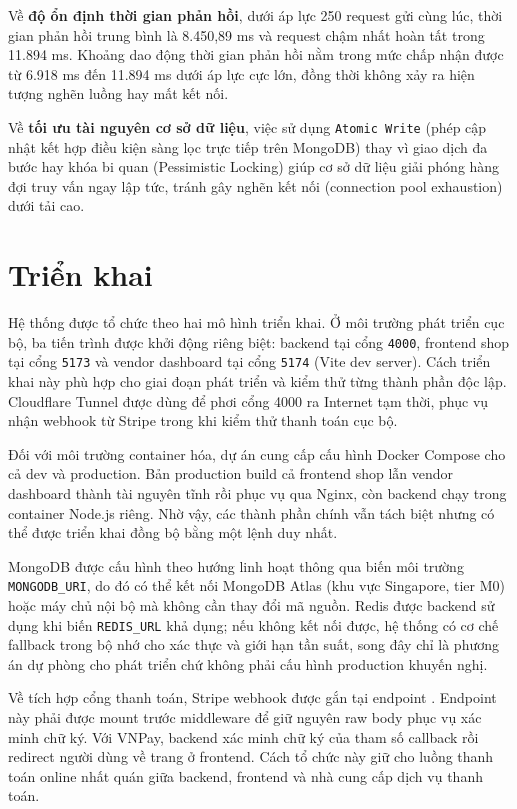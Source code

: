 \documentclass[../DoAn.tex]{subfiles}
\begin{document}
Về \textbf{độ ổn định thời gian phản hồi}, dưới áp lực 250 request gửi cùng lúc, thời gian phản hồi trung bình là 8.450,89 ms và request chậm nhất hoàn tất trong 11.894 ms. Khoảng dao động thời gian phản hồi nằm trong mức chấp nhận được từ 6.918 ms đến 11.894 ms dưới áp lực cực lớn, đồng thời không xảy ra hiện tượng nghẽn luồng hay mất kết nối.

Về \textbf{tối ưu tài nguyên cơ sở dữ liệu}, việc sử dụng \texttt{Atomic Write} (phép cập nhật kết hợp điều kiện sàng lọc trực tiếp trên MongoDB) thay vì giao dịch đa bước hay khóa bi quan (Pessimistic Locking) giúp cơ sở dữ liệu giải phóng hàng đợi truy vấn ngay lập tức, tránh gây nghẽn kết nối (connection pool exhaustion) dưới tải cao.
\section{Triển khai}
\label{section:4.5}

Hệ thống được tổ chức theo hai mô hình triển khai. Ở môi trường phát triển cục bộ, ba tiến trình được khởi động riêng biệt: backend tại cổng \texttt{4000}, frontend shop tại cổng \texttt{5173} và vendor dashboard tại cổng \texttt{5174} (Vite dev server). Cách triển khai này phù hợp cho giai đoạn phát triển và kiểm thử từng thành phần độc lập. Cloudflare Tunnel được dùng để phơi cổng 4000 ra Internet tạm thời, phục vụ nhận webhook từ Stripe trong khi kiểm thử thanh toán cục bộ.

Đối với môi trường container hóa, dự án cung cấp cấu hình Docker Compose cho cả dev và production. Bản production build cả frontend shop lẫn vendor dashboard thành tài nguyên tĩnh rồi phục vụ qua Nginx, còn backend chạy trong container Node.js riêng. Nhờ vậy, các thành phần chính vẫn tách biệt nhưng có thể được triển khai đồng bộ bằng một lệnh duy nhất.

MongoDB được cấu hình theo hướng linh hoạt thông qua biến môi trường \texttt{MONGODB\_URI}, do đó có thể kết nối MongoDB Atlas (khu vực Singapore, tier M0) hoặc máy chủ nội bộ mà không cần thay đổi mã nguồn. Redis được backend sử dụng khi biến \texttt{REDIS\_URL} khả dụng; nếu không kết nối được, hệ thống có cơ chế fallback trong bộ nhớ cho xác thực và giới hạn tần suất, song đây chỉ là phương án dự phòng cho phát triển chứ không phải cấu hình production khuyến nghị.

Về tích hợp cổng thanh toán, Stripe webhook được gắn tại endpoint . Endpoint này phải được mount trước middleware  để giữ nguyên raw body phục vụ xác minh chữ ký. Với VNPay, backend xác minh chữ ký của tham số callback rồi redirect người dùng về trang  ở frontend. Cách tổ chức này giữ cho luồng thanh toán online nhất quán giữa backend, frontend và nhà cung cấp dịch vụ thanh toán.
\end{document}
